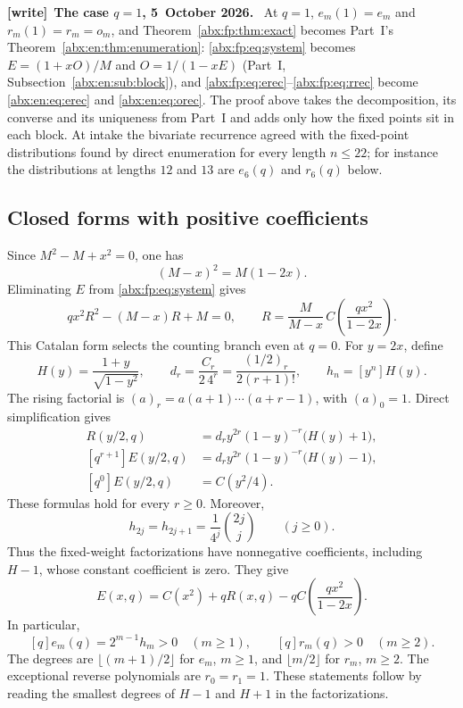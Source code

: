 \documentclass[11pt,letterpaper]{article}
\numberwithin{equation}{section}
\theoremstyle{remark}\newtheorem{remark}[theorem]{Remark}
\newenvironment{writenote}[1][]{\par\smallskip\begingroup\small
 \noindent\textbf{[write]}\if\relax\detokenize{#1}\relax\else~\textbf{#1.}\fi\ }%
 {\par\endgroup\smallskip}
\begin{document}
\begin{writenote}[The case $q=1$, 5~October 2026]
At $q=1$, $e_m(1)=e_m$ and $r_m(1)=r_m=o_m$, and Theorem~\ref{abx:fp:thm:exact} becomes Part~I's Theorem~\ref{abx:en:thm:enumeration}: \eqref{abx:fp:eq:system} becomes $E=(1+xO)/M$ and $O=1/(1-xE)$ (Part~I, Subsection~\ref{abx:en:sub:block}), and \eqref{abx:fp:eq:erec}--\eqref{abx:fp:eq:rrec} become \eqref{abx:en:eq:erec} and \eqref{abx:en:eq:orec}. The proof above takes the decomposition, its converse and its uniqueness from Part~I and adds only how the fixed points sit in each block. At intake the bivariate recurrence agreed with the fixed-point distributions found by direct enumeration for every length $n\le22$; for instance the distributions at lengths $12$ and $13$ are $e_6(q)$ and $r_6(q)$ below.
\end{writenote}

\subsection{Closed forms with positive coefficients}\label{abx:fp:sub:closed}
Since $M^2-M+x^2=0$, one has
\[
 (M-x)^2=M(1-2x).
\]
Eliminating $E$ from \eqref{abx:fp:eq:system} gives
\begin{equation}\label{abx:fp:eq:quadratic}
 qx^2R^2-(M-x)R+M=0,
 \qquad
 R=\frac{M}{M-x}\,C\!\left(\frac{qx^2}{1-2x}\right).
\end{equation}
This Catalan form selects the counting branch even at $q=0$.
For $y=2x$, define
\begin{equation}\label{abx:fp:eq:H}
 H(y)=\frac{1+y}{\sqrt{1-y^2}},\qquad
 d_r=\frac{C_r}{2\,4^r}=\frac{(1/2)_r}{2(r+1)!},\qquad
 h_n=[y^n]H(y).
\end{equation}
The rising factorial is $(a)_r=a(a+1)\cdots(a+r-1)$, with
$(a)_0=1$. Direct simplification gives
\begin{align}
 [q^r]R(y/2,q)&=d_r y^{2r}(1-y)^{-r}\bigl(H(y)+1\bigr),\label{abx:fp:eq:Rfixed}\\
 [q^{r+1}]E(y/2,q)&=d_r y^{2r}(1-y)^{-r}\bigl(H(y)-1\bigr),\label{abx:fp:eq:Efixed}\\
 [q^0]E(y/2,q)&=C(y^2/4).\label{abx:fp:eq:Ezero}
\end{align}
These formulas hold for every $r\ge0$. Moreover,
\begin{equation}\label{abx:fp:eq:h}
 h_{2j}=h_{2j+1}=\frac1{4^j}\binom{2j}{j}\qquad(j\ge0).
\end{equation}
Thus the fixed-weight factorizations have nonnegative coefficients,
including $H-1$, whose constant coefficient is zero. They give
\begin{equation}\label{abx:fp:eq:identity}
 E(x,q)=C(x^2)+qR(x,q)-qC\!\left(\frac{qx^2}{1-2x}\right).
\end{equation}
In particular,
\[
 [q]e_m(q)=2^{m-1}h_m>0\quad(m\ge1),\qquad
 [q]r_m(q)>0\quad(m\ge2).
\]
The degrees are $\lfloor(m+1)/2\rfloor$ for $e_m$, $m\ge1$, and
$\lfloor m/2\rfloor$ for $r_m$, $m\ge2$. The exceptional reverse
polynomials are $r_0=r_1=1$. These statements follow by reading the
smallest degrees of $H-1$ and $H+1$ in the factorizations.
\end{document}
